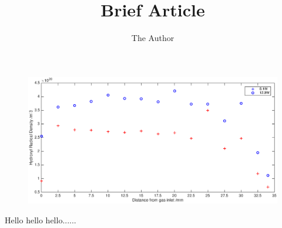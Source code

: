 \documentclass[11pt, oneside]{article}   	%
\title{Brief Article}
\author{The Author}
\begin{document}
\maketitle

\begin{figure}
\includegraphics{Figures/SpatialResolution.eps}
\end{figure}
Hello hello hello......
\end{document}
